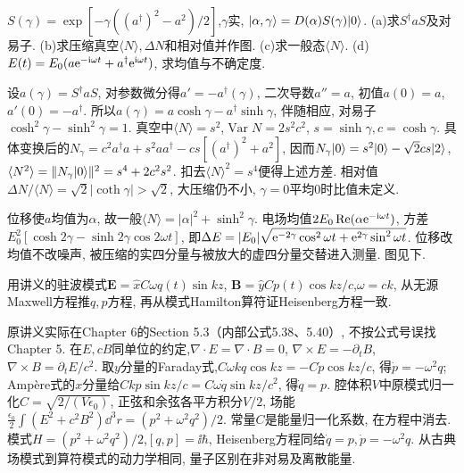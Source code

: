 \begin{exercise}
$S(\gamma)=\exp[-\gamma((a^\dagger)^2-a^2)/2]$,$\gamma$实, $\lvert \alpha,\gamma\rangle=D(\alpha)S(\gamma)\lvert 0\rangle$. (a)求$S^\dagger aS$及对易子. (b)求压缩真空$\langle N\rangle,\Delta N$和相对值并作图. (c)求一般态$\langle N\rangle$. (d)$E(t)=E_0(a\mathrm e^{-\mathrm i\omega t}+a^\dagger\mathrm e^{\mathrm i\omega t})$, 求均值与不确定度.
\end{exercise}
\begin{solution}
设$a(\gamma)=S^\dagger aS$, 对参数微分得$a'=-a^\dagger(\gamma)$, 二次导数$a''=a$, 初值$a(0)=a$, $a'(0)=-a^\dagger$. 所以$a(\gamma)=a\cosh\gamma-a^\dagger\sinh\gamma$, 伴随相应, 对易子$\cosh^2\gamma-\sinh^2\gamma=1$. 真空中$\langle N\rangle=s^2$,$\operatorname{Var}N=2s^2c^2$, $s=\sinh\gamma,c=\cosh\gamma$. 具体变换后的$N_\gamma=c^2a^\dagger a+s^2aa^\dagger-cs[(a^\dagger)^2+a^2]$, 因而$N_\gamma\lvert 0\rangle=s^2\lvert 0\rangle-\sqrt2cs\lvert 2\rangle$, $\langle N^2\rangle=\lVert N_\gamma\lvert 0\rangle\rVert^2=s^4+2c^2s^2$. 扣去$\langle N\rangle^2=s^4$便得上述方差. 相对值$\Delta N/\langle N\rangle=\sqrt2|\coth\gamma|>\sqrt2$, 大压缩仍不小, $\gamma=0$平均0时比值未定义.

位移使$a$均值为$\alpha$, 故一般$\langle N\rangle=|\alpha|^2+\sinh^2\gamma$. 电场均值$2E_0\operatorname{Re}(\alpha\mathrm e^{-\mathrm i\omega t})$, 方差$E_0^2[\cosh2\gamma-\sinh2\gamma\cos2\omega t]$, 即$\Delta E=|E_0|\sqrt{\mathrm e^{-2\gamma}\cos^2\omega t+\mathrm e^{2\gamma}\sin^2\omega t}$. 位移改均值不改噪声, 被压缩的实四分量与被放大的虚四分量交替进入测量. 图见下.

\end{solution}
\begin{exercise}
用讲义的驻波模式$\boldsymbol E=\hat xC\omega q(t)\sin kz$, $\boldsymbol B=\hat yCp(t)\cos kz/c$,$\omega=ck$, 从无源Maxwell方程推$q,p$方程, 再从模式Hamilton算符证Heisenberg方程一致.
\end{exercise}
\begin{solution}
原讲义实际在Chapter 6的Section 5.3（内部公式5.38、5.40）, 不按公式号误找Chapter 5. 在$E,cB$同单位的约定,$\nabla\cdot E=\nabla\cdot B=0$, $\nabla\times E=-\partial_tB$, $\nabla\times B=\partial_tE/c^2$. 取$y$分量的Faraday式,$C\omega kq\cos kz=-C\dot p\cos kz/c$, 得$\dot p=-\omega^2q$; Ampère式的$x$分量给$Ckp\sin kz/c=C\omega\dot q\sin kz/c^2$, 得$\dot q=p$. 腔体积$V$中原模式归一化$C=\sqrt{2/(V\epsilon_0)}$, 正弦和余弦各平方积分$V/2$, 场能$\frac{\epsilon_0}2\int(E^2+c^2B^2)\dd^3r=(p^2+\omega^2q^2)/2$. 常量$C$是能量归一化系数, 在方程中消去. 模式$H=(p^2+\omega^2q^2)/2$,$[q,p]=\ii\hbar$, Heisenberg方程同给$\dot q=p,\dot p=-\omega^2q$. 从古典场模式到算符模式的动力学相同, 量子区别在非对易及离散能量.
\end{solution}
